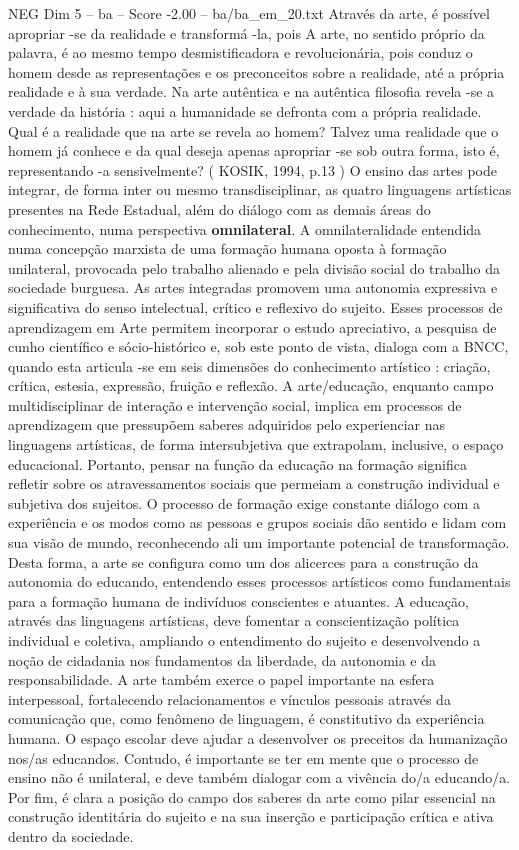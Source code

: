 \begin{textsample}{NEG Dim 5 – ba – Score -2.00 – ba/ba\_em\_20.txt}
Através da arte, é possível apropriar -se da realidade e transformá -la, pois A arte, no sentido próprio da palavra, é ao mesmo tempo desmistificadora e revolucionária, pois conduz o homem desde as representações e os preconceitos sobre a realidade, até a própria realidade e à sua verdade.
Na arte autêntica e na autêntica filosofia revela -se a verdade da história : aqui a humanidade se defronta com a própria realidade.
Qual é a realidade que na arte se revela ao homem?
Talvez uma realidade que o homem já conhece e da qual deseja apenas apropriar -se sob outra forma, isto é, representando -a sensivelmente? ( KOSIK, 1994, p.13 ) O ensino das artes pode integrar, de forma inter ou mesmo transdisciplinar, as quatro linguagens artísticas presentes na Rede Estadual, além do diálogo com as demais áreas do conhecimento, numa perspectiva \textbf{omnilateral}.
A omnilateralidade entendida numa concepção marxista de uma formação humana oposta à formação unilateral, provocada pelo trabalho alienado e pela divisão social do trabalho da sociedade burguesa.
As artes integradas promovem uma autonomia expressiva e significativa do senso intelectual, crítico e reflexivo do sujeito.
Esses processos de aprendizagem em Arte permitem incorporar o estudo apreciativo, a pesquisa de cunho científico e sócio-histórico e, sob este ponto de vista, dialoga com a BNCC, quando esta articula -se em seis dimensões do conhecimento artístico : criação, crítica, estesia, expressão, fruição e reflexão.
A arte/educação, enquanto campo multidisciplinar de interação e intervenção social, implica em processos de aprendizagem que pressupõem saberes adquiridos pelo experienciar nas linguagens artísticas, de forma intersubjetiva que extrapolam, inclusive, o espaço educacional.
Portanto, pensar na função da educação na formação significa refletir sobre os atravessamentos sociais que permeiam a construção individual e subjetiva dos sujeitos.
O processo de formação exige constante diálogo com a experiência e os modos como as pessoas e grupos sociais dão sentido e lidam com sua visão de mundo, reconhecendo ali um importante potencial de transformação.
Desta forma, a arte se configura como um dos alicerces para a construção da autonomia do educando, entendendo esses processos artísticos como fundamentais para a formação humana de indivíduos conscientes e atuantes.
A educação, através das linguagens artísticas, deve fomentar a conscientização política individual e coletiva, ampliando o entendimento do sujeito e desenvolvendo a noção de cidadania nos fundamentos da liberdade, da autonomia e da responsabilidade.
A arte também exerce o papel importante na esfera interpessoal, fortalecendo relacionamentos e vínculos pessoais através da comunicação que, como fenômeno de linguagem, é constitutivo da experiência humana.
O espaço escolar deve ajudar a desenvolver os preceitos da humanização nos/as educandos.
Contudo, é importante se ter em mente que o processo de ensino não é unilateral, e deve também dialogar com a vivência do/a educando/a.
Por fim, é clara a posição do campo dos saberes da arte como pilar essencial na construção identitária do sujeito e na sua inserção e participação crítica e ativa dentro da sociedade.

\end{textsample}
